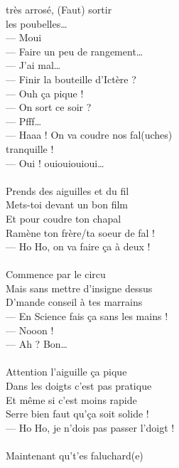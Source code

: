 
 très arrosé, (Faut) sortir
\\les poubelles…
\\— Moui
\\— Faire un peu de rangement…
\\— J’ai mal…
\\— Finir la bouteille d’Ictère ?
\\— Ouh ça pique !
\\— On sort ce soir ?
\\— Pfff…
\\— Haaa ! On va coudre nos fal(uches)
\\tranquille !
\\— Oui ! ouiouiouioui…
\\\\Prends des aiguilles et du fil
\\Mets-toi devant un bon film
\\Et pour coudre ton chapal
\\Ramène ton frère/ta soeur de fal !
\\— Ho Ho, on va faire ça à deux !
\\\\Commence par le circu
\\Mais sans mettre d’insigne dessus
\\D’mande conseil à tes marrains
\\— En Science fais ça sans les mains !
\\— Nooon !
\\— Ah ? Bon…
\\\\Attention l’aiguille ça pique
\\Dans les doigts c’est pas pratique
\\Et même si c’est moins rapide
\\Serre bien faut qu’ça soit solide !
\\— Ho Ho, je n’dois pas passer l’doigt !
\breakpage
\\\\Maintenant qu’t’es faluchard(e)
